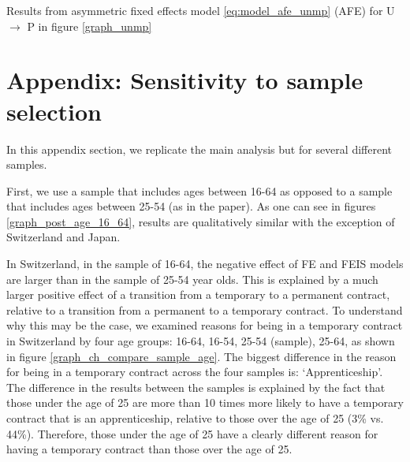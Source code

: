 \begin{table}[!h]
    \caption{Results from asymmetric fixed effects model \ref{eq:model_afe_unmp} (AFE) for U $\rightarrow$ P in figure \ref{graph_unmp}}
    \centering
    
    \label{beta_coef_unmp_afe_u_p}
\end{table}

\clearpage
\section{Appendix: Sensitivity to sample selection}\label{appendix:sensitivity_sample}
\setcounter{table}{0}
\setcounter{figure}{0}
\renewcommand*\thetable{\Alph{section}.\arabic{table}}
\renewcommand*\thefigure{\Alph{section}.\arabic{figure}}
\renewcommand{\theHfigure}{\Alph{section}.\arabic{table}}
\renewcommand{\theHtable}{\Alph{section}.\arabic{figure}}

In this appendix section, we replicate the main analysis but for several different samples.  

First, we use a sample that includes ages between 16-64 as opposed to a sample that includes ages between 25-54 (as in the paper).  As one can see in figures \ref{graph_post_age_16_64}, results are qualitatively similar with the exception of Switzerland and Japan.  

In Switzerland, in the sample of 16-64, the negative effect of FE and FEIS models are larger than in the sample of 25-54 year olds.  This is explained by a much larger positive effect of a transition from a temporary to a permanent contract, relative to a transition from a permanent to a temporary contract.  To understand why this may be the case, we examined reasons for being in a temporary contract in Switzerland by four age groups: 16-64, 16-54, 25-54 (sample), 25-64, as shown in figure \ref{graph_ch_compare_sample_age}.  The biggest difference in the reason for being in a temporary contract across the four samples is: `Apprenticeship'.  The difference in the results between the samples is explained by the fact that those under the age of 25 are more than 10 times more likely to have a temporary contract that is an apprenticeship, relative to those over the age of 25 (3\% vs. 44\%).  Therefore, those under the age of 25 have a clearly different reason for having a temporary contract than those over the age of 25.  


